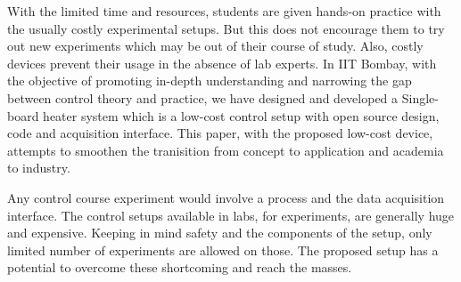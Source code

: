 With the limited time and resources,
students are given hands-on practice with the usually costly
experimental setups. But this does not encourage them to try out new
experiments which may be out of their course of study. Also, costly
devices prevent their usage in the absence of lab experts. In IIT
Bombay, with the objective of promoting in-depth understanding and
narrowing the gap between control theory and practice, we have
designed and developed a Single-board heater system which is a
low-cost control setup with open source design, code and acquisition
interface.  This paper, with the proposed low-cost device, attempts to
smoothen the tranisition from concept to application and academia to
industry. 

Any control course experiment would involve a process and the data
acquisition interface. The control setups available in labs, for
experiments, are generally huge and expensive. Keeping in mind safety
and the components of the setup, only limited number of experiments
are allowed on those. The proposed setup has a potential to overcome
these shortcoming and reach the masses.
